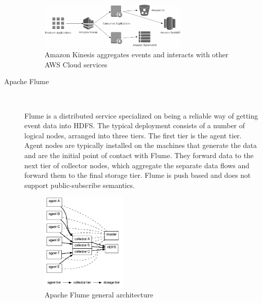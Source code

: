 \begin{description}
{   \begin{figure}[H]
     \centering
     \includegraphics[width=0.7\textwidth]{images/amazon-kinesis.png}
         \caption{Amazon Kinesis aggregates events and interacts with other AWS
         Cloud services \cite{amazonKinesis}}
        \label{fig:amazon-kinesis}
    \end{figure}
    }
    \item [Apache Flume] \hfill \\
    {Flume is a distributed service specialized on being a reliable way of
    getting event data into HDFS. The typical deployment consists
    of a number of logical nodes, arranged into three tiers. The first tier
    is the agent tier. Agent nodes are typically installed on the machines
    that generate the data and are the initial point of contact with Flume.
    They forward data to the next tier of collector nodes, which aggregate the
    separate data flows and forward them to the final storage tier. Flume is
    push based and does not support public-subscribe semantics. \cite{apacheflumeDoc}
    \begin{figure}[H]
     \centering
     \includegraphics[width=0.4\textwidth]{images/flume-architecture.png}
     \caption{Apache Flume general architecture \cite{apacheflumeDoc}} 
        \label{fig:flume-architecture}
    \end{figure}

    }
\end{description}
